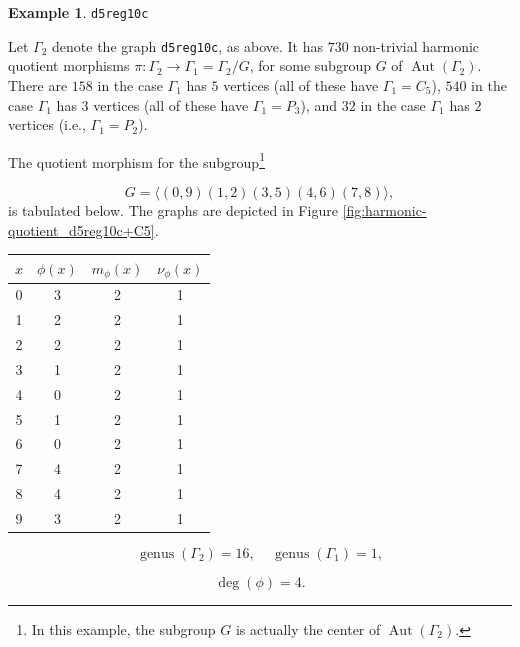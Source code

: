 \documentclass[12pt,letterpaper]{article}
\theoremstyle{definition}
\newtheorem{example}[theorem]{Example}
\DeclareMathOperator{\Aut}{Aut}
\DeclareMathOperator{\genus}{genus}
\begin{document}
\begin{example}%
\label{example:d5reg10c}
  {\tt d5reg10c}\newline
{\rm  
  Let $\Gamma_2$ denote the graph {\tt d5reg10c}, as above.
It has $730$  non-trivial harmonic quotient morphisms
$\pi: \Gamma_2\to \Gamma_1=\Gamma_2/G$,
for some subgroup $G$ of $\Aut(\Gamma_2)$.
There are $158$ in the case $\Gamma_1$ has $5$ vertices
(all of these have $\Gamma_1=C_5$),
$540$ in the case $\Gamma_1$ has $3$ vertices
(all of these have $\Gamma_1=P_3$),
and $32$ in the case $\Gamma_1$ has $2$ vertices
(i.e., $\Gamma_1=P_2$).

The quotient morphism for the
subgroup\footnote{In this example, the subgroup $G$
is actually the center of $\Aut(\Gamma_2)$.}

\[
G=\langle (0,9)(1,2)(3,5)(4,6)(7,8) \rangle,
\]
is tabulated below. The graphs are depicted in
Figure \ref{fig:harmonic-quotient_d5reg10c+C5}.

\begin{center}
\begin{tabular}{c|c|c|c}  
  $x$ & $\phi(x)$ & $m_\phi(x)$ & $\nu_\phi(x)$ \\ \hline
  0   &    3   &        2         &  1   \\ 
  1   &    2   &        2         &  1  \\ 
  2   &    2   &        2         &  1  \\ 
  3   &    1   &        2         &  1  \\ 
  4   &    0   &        2         &  1   \\ 
  5   &    1   &        2         &  1    \\ 
  6   &    0   &        2         &  1   \\ 
  7   &    4   &        2         &  1   \\
  8   &    4   &        2         &  1   \\
  9   &    3   &        2         &  1   \\
\end{tabular}
\end{center}

\[
  \genus(\Gamma_2) =16,\ \ \ \ \
  \genus(\Gamma_1) =1,
\]

\[
\deg(\phi) =4.
\]

}
\end{example}
\end{document}
